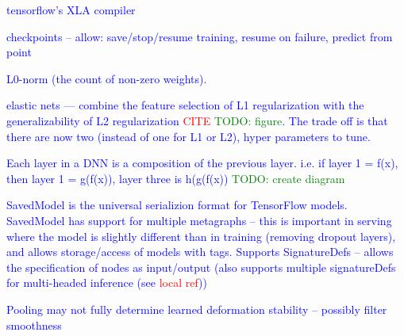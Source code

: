 

\textcolor{blue}{tensorflow's XLA compiler}

\textcolor{blue}{checkpoints -- allow: save/stop/resume training, resume on failure, predict from point}







\textcolor{blue}{L0-norm (the count of non-zero weights).}


\textcolor{blue}{elastic nets --- combine the feature selection of L1 regularization with the generalizability of L2 regularization \textcolor{red}{CITE} \textcolor{green}{TODO: figure}. The trade off is that there are now two (instead of one for L1 or L2), hyper parameters to tune.}


\textcolor{blue}{Each layer in a DNN is a composition of the previous layer. i.e. if layer 1 = f(x), then layer 1 = g(f(x)), layer three is h(g(f(x)) \textcolor{green}{TODO: create diagram}}



\textcolor{blue}{SavedModel is the universal serializion format for TensorFlow models. SavedModel has support for multiple metagraphs -- this is important in serving where the model is slightly different than in training (removing dropout layers), and allows storage/access of models with tags. Supports SignatureDefs -- allows the specification of nodes as input/output (also supports multiple signatureDefs for multi-headed inference (see \textcolor{red}{local ref}))}




\textcolor{blue}{Pooling may not fully determine learned deformation stability -- possibly filter smoothness\cite{ruderman2018learned}}